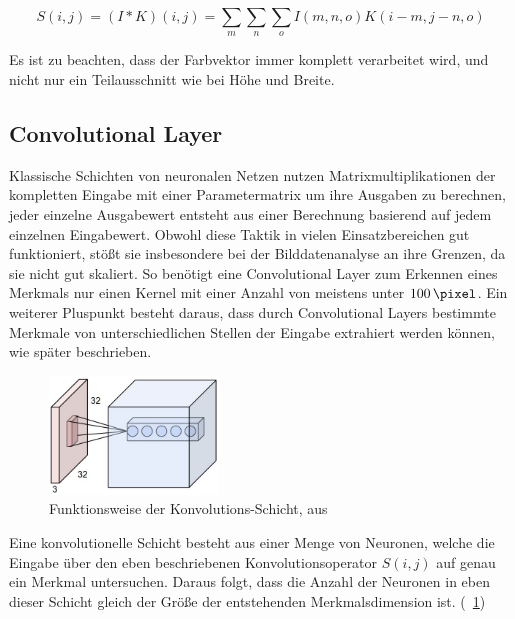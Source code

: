 \begin{equation}
S(i,j) = (I*K)(i,j) = \sum_{m}\sum_{n}\sum_{o}I(m,n,o)K(i-m,j-n,o)
\end{equation}

Es ist zu beachten, dass der Farbvektor immer komplett verarbeitet wird, und nicht nur ein Teilausschnitt wie bei Höhe und Breite.

\subsection{Convolutional Layer}
\label{ssec:convlayer}

Klassische Schichten von neuronalen Netzen nutzen Matrixmultiplikationen der kompletten Eingabe mit einer Parametermatrix um ihre Ausgaben zu berechnen, \dahe jeder einzelne Ausgabewert entsteht aus einer Berechnung basierend auf jedem einzelnen Eingabewert. Obwohl diese Taktik in vielen Einsatzbereichen gut funktioniert, stößt sie insbesondere bei der Bilddatenanalyse an ihre Grenzen, da sie nicht gut skaliert. \cite{cs231n} So benötigt eine Convolutional Layer zum Erkennen eines Merkmals nur einen Kernel mit einer Anzahl von meistens unter $\SI{100}{\pixel}$. \cite{deeplearning_16} Ein weiterer Pluspunkt besteht daraus, dass durch Convolutional Layers bestimmte Merkmale von unterschiedlichen Stellen der Eingabe extrahiert werden können, wie später beschrieben.

\begin{figure}[H]
	\centering
	\includegraphics[width=0.4\textwidth,keepaspectratio]{images/cs231n/convolutional.jpg}
	\caption{Funktionsweise der Konvolutions-Schicht, aus \cite{cs231n}}
	\label{fig:convolutional}
\end{figure}

Eine konvolutionelle Schicht besteht aus einer Menge von Neuronen, welche die Eingabe über den eben beschriebenen Konvolutionsoperator $S(i,j)$ auf genau ein Merkmal untersuchen. Daraus folgt, dass die Anzahl der Neuronen in eben dieser Schicht gleich der Größe der entstehenden Merkmalsdimension ist. (\vgl \figurename~\ref{fig:convolutional})

